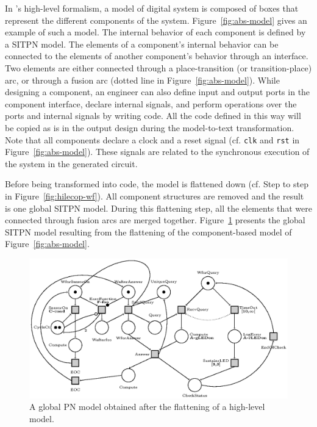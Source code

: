 \documentclass[pdflatex,sn-mathphys]{sn-jnl}%
\theoremstyle{thmstyleone}%
\theoremstyle{thmstyletwo}%
\theoremstyle{thmstylethree}%
\begin{document}
In \hilecop{}'s high-level formalism, a model of digital system is
composed of boxes that represent the different components of the
system. Figure~\ref{fig:abs-model} gives an example of such a model.
The internal behavior of each component is defined by a SITPN model.
The elements of a component's internal behavior can be connected to
the elements of another component's behavior through an interface. Two
elements are either connected through a place-transition (or
transition-place) arc, or through a fusion arc (dotted line in
Figure~\ref{fig:abs-model}). While designing a component, an engineer
can also define input and output ports in the component interface,
declare internal signals, and perform operations over the ports and
internal signals by writing \vhdl{} code. All the \vhdl{} code defined
in this way will be copied as is in the output \vhdl{} design during
the model-to-text transformation. Note that all components declare a
clock and a reset signal (cf. \texttt{clk} and \texttt{rst} in
Figure~\ref{fig:abs-model}). These signals are related to the
synchronous execution of the system in the generated circuit.

Before being transformed into \vhdl{} code, the model is flattened
down (cf. Step  to step  in
Figure~\ref{fig:hilecop-wf}). All component structures are removed and
the result is one global SITPN model. During this flattening step, all
the elements that were connected through fusion arcs are merged
together. Figure~\ref{fig:impl-model} presents the global SITPN model
resulting from the flattening of the component-based model of
Figure~\ref{fig:abs-model}.

\begin{figure}[H]
\centering
\includegraphics[keepaspectratio=true,width=.8\textwidth] {impl-model.eps}
\caption[Global PN model.]{A global PN model obtained
  after the flattening of a \hilecop{} high-level model.}
\label{fig:impl-model}
\end{figure}
\end{document}
